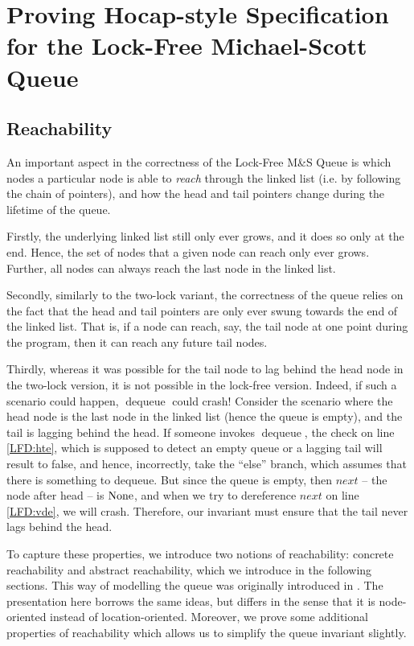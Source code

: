\documentclass[a4paper, 10pt]{report}
\theoremstyle{definition}
\newcommand{\dequeue}{\operatorname{dequeue}}
\newcommand{\msq}{M\&S Queue}
\newcommand{\lfmsq}{Lock-Free \msq{}}
\begin{document}
\chapter{Proving Hocap-style Specification for the Lock-Free Michael-Scott Queue}
\label{ch:LFMSQSPECS}

\section{Reachability}
\label{LFMSQ:section:reachability}

An important aspect in the correctness of the \lfmsq{} is which nodes a particular node is able to \textit{reach} through the linked list (i.e. by following the chain of pointers), and how the head and tail pointers change during the lifetime of the queue.

Firstly, the underlying linked list still only ever grows, and it does so only at the end. Hence, the set of nodes that a given node can reach only ever grows. Further, all nodes can always reach the last node in the linked list.

Secondly, similarly to the two-lock variant, the correctness of the queue relies on the fact that the head and tail pointers are only ever swung towards the end of the linked list. That is, if a node can reach, say, the tail node at one point during the program, then it can reach any future tail nodes.

Thirdly, whereas it was possible for the tail node to lag behind the head node in the two-lock version, it is not possible in the lock-free version. Indeed, if such a scenario could happen, $\dequeue$ could crash! Consider the scenario where the head node is the last node in the linked list (hence the queue is empty), and the tail is lagging behind the head. If someone invokes $\dequeue$, the check on line \ref{LFD:hte}, which is supposed to detect an empty queue or a lagging tail will result to false, and hence, incorrectly, take the ``else'' branch, which assumes that there is something to dequeue. But since the queue is empty, then $next$ -- the node after head -- is $\operatorname{None}$, and when we try to dereference $next$ on line \ref{LFD:vde}, we will crash. Therefore, our invariant must ensure that the tail never lags behind the head.

To capture these properties, we introduce two notions of reachability: concrete reachability and abstract reachability, which we introduce in the following sections. This way of modelling the queue was originally introduced in \citet{DBLP:conf/cpp/VindumB21}. The presentation here borrows the same ideas, but differs in the sense that it is node-oriented instead of location-oriented. Moreover, we prove some additional properties of reachability which allows us to simplify the queue invariant slightly.
\end{document}
